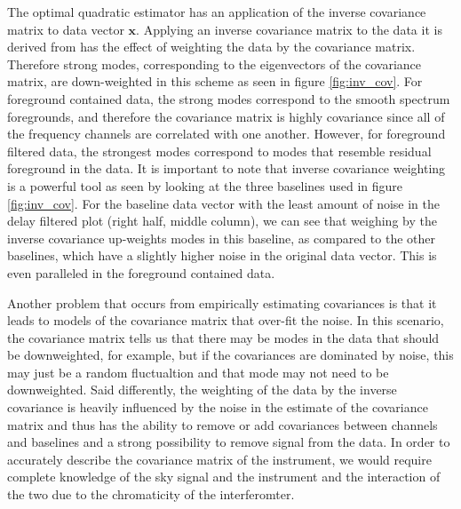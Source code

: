 \documentclass[twocolumn,numberedappendix]{emulateapj} \shorttitle{PSA64}
\newcommand{\x}{\mathbf{x}} \newcommand{\xhat}{\hat{\mathbf{x}}}
\begin{document}
The optimal quadratic estimator has an application of the inverse covariance
matrix to data vector $\x$. Applying an inverse covariance matrix to the data it
is derived from has the effect of weighting the data by the covariance matrix.
Therefore strong modes, corresponding to the eigenvectors of the covariance
matrix, are down-weighted in this scheme as seen in figure \ref{fig:inv_cov}.
For foreground contained data, the strong modes correspond to the smooth
spectrum foregrounds, and therefore the covariance matrix is highly covariance
since all of the frequency channels are correlated with one another. However,
for foreground filtered data, the strongest modes correspond to modes that
resemble residual foreground in the data. It is important to note that inverse
covariance weighting is a powerful tool as seen by looking at the three
baselines used in figure \ref{fig:inv_cov}. For the baseline data vector with
the least amount of noise in the delay filtered plot (right half, middle
column), we can see that weighing by the inverse covariance up-weights modes in
this baseline, as compared to the other baselines, which have a slightly higher
noise in the original data vector. This is even paralleled in the foreground
contained data.
%


Another problem that occurs from empirically estimating covariances is that it
leads to models of the covariance matrix that over-fit the noise. In this
scenario, the covariance matrix tells us that there may be modes in the data
that should be downweighted, for example, but if the covariances are dominated
by noise, this may just be a random fluctualtion and that mode may not need to
be downweighted. Said differently, the weighting of the data by the inverse
covariance is heavily influenced by the noise in the estimate of the covariance
matrix and thus has the ability to remove or add  covariances between channels
and baselines and a strong possibility to remove signal from the data. In order to accurately describe the covariance matrix of the instrument, we would require complete knowledge of the sky signal and the instrument and the interaction of the two due to the chromaticity of the interferomter.
\end{document}
